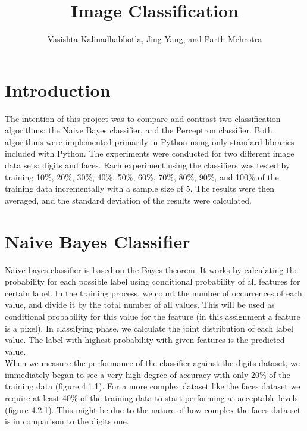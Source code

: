 \documentclass[12pt, letterpaper]{article}
\title{Image Classification}
\author{
  Vasishta Kalinadhabhotla, Jing Yang, and Parth Mehrotra
}
\begin{document}
\maketitle
\section{Introduction}
  The intention of this project was to compare and contrast two classification algorithms: the Naive Bayes classifier, and the Perceptron classifier. Both algorithms were implemented primarily in Python using only standard libraries included with Python. The experiments were conducted for two different image data sets: digits and faces. Each experiment using the classifiers was tested by training 10\%, 20\%, 30\%, 40\%, 50\%, 60\%, 70\%, 80\%, 90\%, and 100\% of the training data incrementally with a sample size of 5. The results were then averaged, and the standard deviation of the results were calculated. \\ 
\section{Naive Bayes Classifier}
  Naive bayes classifier is based on the Bayes theorem. It works by calculating the probability for each possible label using conditional probability of all features for certain label. In the training process, we count the number of occurrences of each value, and divide it by the total number of all values. This will be used as conditional probability for this value for the feature (in this assignment a feature is a pixel). In classifying phase, we calculate the joint distribution of each label value. The label with highest probability with given features is the predicted value. \\ 
    When we measure the performance of the classifier against the digits dataset, we immediately began to see a very high degree of accuracy with only 20\% of the training data (figure 4.1.1). For a more complex dataset like the faces dataset we require at least 40\% of the training data to start performing at acceptable levels (figure 4.2.1). This might be due to the nature of how complex the faces data set is in comparison to the digits one. \\
\end{document}
